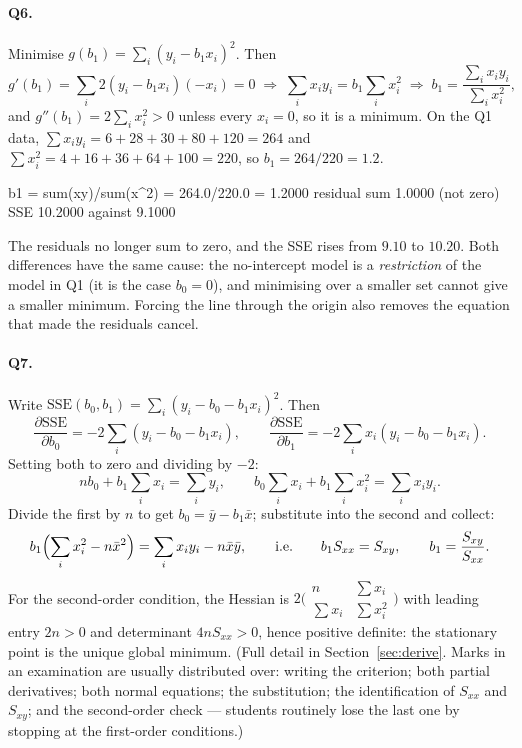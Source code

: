 \documentclass[11pt]{article}
\begin{document}
\paragraph{Q6.} Minimise $g(b_1) = \sum_i (y_i - b_1x_i)^2$. Then
\[
  g'(b_1) = \sum_i 2(y_i - b_1x_i)(-x_i) = 0
  \;\Longrightarrow\;
  \sum_i x_iy_i = b_1\sum_i x_i^2
  \;\Longrightarrow\;
  b_1 = \frac{\sum_i x_iy_i}{\sum_i x_i^2},
\]
and $g''(b_1) = 2\sum_i x_i^2 > 0$ unless every $x_i = 0$, so it is a
minimum. On the Q1 data, $\sum x_iy_i = 6+28+30+80+120 = 264$ and
$\sum x_i^2 = 4+16+36+64+100 = 220$, so $b_1 = 264/220 = 1.2$.
\begin{codeout}
   b1 = sum(xy)/sum(x^2) = 264.0/220.0 = 1.2000
   residual sum 1.0000 (not zero)   SSE 10.2000 against 9.1000
\end{codeout}
The residuals no longer sum to zero, and the SSE rises from $9.10$ to $10.20$.
Both differences have the same cause: the no-intercept model is a
\emph{restriction} of the model in Q1 (it is the case $b_0 = 0$), and
minimising over a smaller set cannot give a smaller minimum. Forcing the line
through the origin also removes the equation that made the residuals cancel.

\paragraph{Q7.} Write $\mathrm{SSE}(b_0,b_1) = \sum_i(y_i-b_0-b_1x_i)^2$.
Then
\[
  \frac{\partial\mathrm{SSE}}{\partial b_0} = -2\sum_i(y_i-b_0-b_1x_i),
  \qquad
  \frac{\partial\mathrm{SSE}}{\partial b_1} = -2\sum_i x_i(y_i-b_0-b_1x_i).
\]
Setting both to zero and dividing by $-2$:
\[
  nb_0 + b_1\sum_i x_i = \sum_i y_i,
  \qquad
  b_0\sum_i x_i + b_1\sum_i x_i^2 = \sum_i x_iy_i .
\]
Divide the first by $n$ to get $b_0 = \bar y - b_1\bar x$; substitute into the
second and collect:
\[
  b_1\Bigl(\sum_i x_i^2 - n\bar x^2\Bigr) = \sum_i x_iy_i - n\bar x\bar y,
  \qquad\text{i.e.}\qquad
  b_1 S_{xx} = S_{xy}, \qquad b_1 = \frac{S_{xy}}{S_{xx}} .
\]
For the second-order condition, the Hessian is
$2\bigl(\begin{smallmatrix} n & \sum x_i\\ \sum x_i & \sum x_i^2
\end{smallmatrix}\bigr)$ with leading entry $2n>0$ and determinant
$4nS_{xx}>0$, hence positive definite: the stationary point is the unique
global minimum. (Full detail in Section~\ref{sec:derive}. Marks in an
examination are usually distributed over: writing the criterion; both partial
derivatives; both normal equations; the substitution; the identification of
$S_{xx}$ and $S_{xy}$; and the second-order check --- students routinely lose
the last one by stopping at the first-order conditions.)
\end{document}
